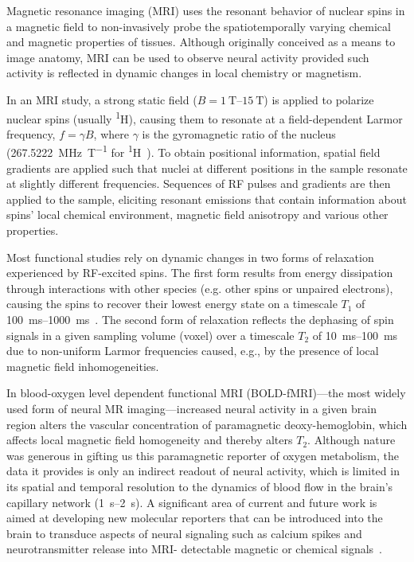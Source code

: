 Magnetic resonance imaging (MRI) uses the resonant behavior of nuclear spins in a magnetic field to non-invasively probe the spatiotemporally varying chemical and magnetic properties of tissues.
Although originally conceived as a means to image anatomy, MRI can be used to observe neural activity provided such activity is reflected in dynamic changes in local chemistry or magnetism.

In an MRI study, a strong static field ($B = \SIrange{1}{15}{\tesla}$) is applied to polarize nuclear spins (usually \textsuperscript{1}H), causing them to resonate at a field-dependent Larmor frequency, $f=\gamma B$, where $\gamma$ is the gyromagnetic ratio of the nucleus (\SI{267.5222}{\mega\hertz\per\tesla} for \textsuperscript{1}H~\cite{codata10}).
To obtain positional information, spatial field gradients are applied such that nuclei at different positions in the sample resonate at slightly different frequencies.
Sequences of RF pulses and gradients are then applied to the sample, eliciting resonant emissions that contain information about spins' local chemical environment, magnetic field anisotropy and various other properties.

Most functional studies rely on dynamic changes in two forms of relaxation experienced by RF-excited spins.
The first form results from energy dissipation through interactions with other species (e.g. other spins or unpaired electrons), causing the spins to recover their lowest energy state on a timescale $T_1$ of \SIrange{100}{1000}{\milli\second}~\cite{rooney07}.
The second form of relaxation reflects the dephasing of spin signals in a given sampling volume (voxel) over a timescale $T_2$ of \SIrange{10}{100}{\milli\second}~\cite{deichmann95} due to non-uniform Larmor frequencies caused, e.g., by the presence of local magnetic field inhomogeneities.

In blood-oxygen level dependent functional MRI (BOLD-fMRI)---the most widely used form of neural MR imaging---increased neural activity in a given brain region alters the vascular concentration of paramagnetic deoxy-hemoglobin, which affects local magnetic field homogeneity and thereby alters $T_2$.
Although nature was generous in gifting us this paramagnetic reporter of oxygen metabolism, the data it provides is only an indirect readout of neural activity, which is limited in its spatial and temporal resolution to the dynamics of blood flow in the brain's capillary network (\SIrange{1}{2}{\second}).
A significant area of current and future work is aimed at developing new molecular reporters that can be introduced into the brain to transduce aspects of neural signaling such as calcium spikes and neurotransmitter release into MRI- detectable magnetic or chemical signals~\cite{shapiro10,koretsky12,hsieh12}.

